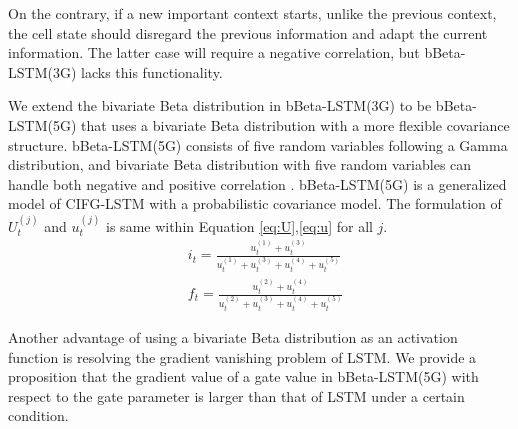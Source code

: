 \documentclass[letterpaper]{article} %
\begin{document}
On the contrary, if a new important context starts, unlike the previous context, the cell state should disregard the previous information and adapt the current information. The latter case will require a negative correlation, but bBeta-LSTM(3G) lacks this functionality.

We extend the bivariate Beta distribution in bBeta-LSTM(3G) to be bBeta-LSTM(5G) that uses a bivariate Beta distribution with a more flexible covariance structure. bBeta-LSTM(5G) consists of five random variables following a Gamma distribution, and bivariate Beta distribution with five random variables can handle both negative and positive correlation \cite{ARNOLD20111194}. bBeta-LSTM(5G) is a generalized model of CIFG-LSTM with a probabilistic covariance model. The formulation of $U_{t}^{(j)}$ and $u_{t}^{(j)}$ is same within Equation \ref{eq:U},\ref{eq:u} for all $j$.
\begin{align}
	&i_{t} = \frac{u_{t}^{(1)}+u_{t}^{(3)}}{u_{t}^{(1)}+u_{t}^{(3)}+u_{t}^{(4)}+u_{t}^{(5)}} \label{eq:5G_input} \\ 
	&f_{t} = \frac{u_{t}^{(2)}+u_{t}^{(4)}}{u_{t}^{(2)}+u_{t}^{(3)}+u_{t}^{(4)}+u_{t}^{(5)}} \label{eq:5G_forget}
\end{align}

Another advantage of using a bivariate Beta distribution as an activation function is resolving the gradient vanishing problem of LSTM. We provide a proposition that the gradient value of a gate value in bBeta-LSTM(5G) with respect to the gate parameter is larger than that of LSTM under a certain condition.
\end{document}
